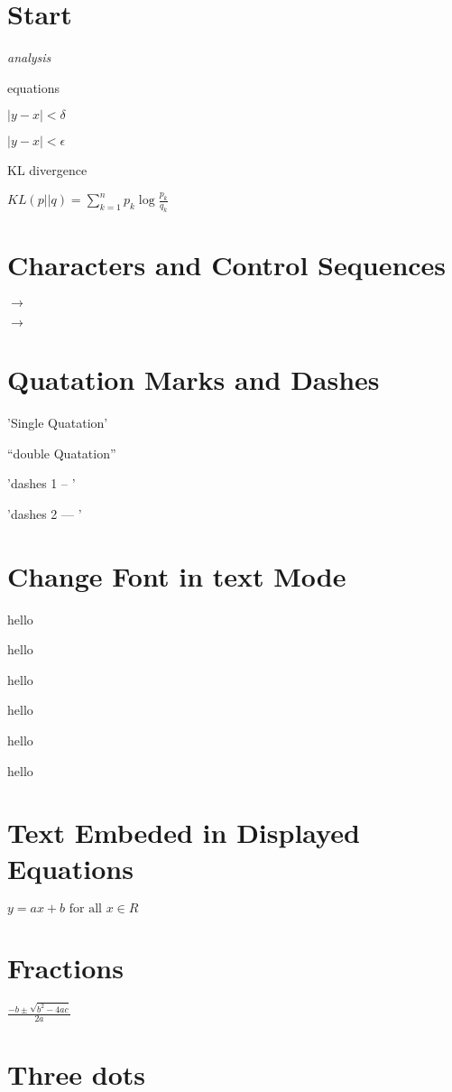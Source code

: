 \documentclass{beamer}
\begin{document}
\section{Start}

\noindent
\emph{analysis}

equations 

$|y-x| < \delta $

$|y-x| < \epsilon$

KL divergence

$KL(p||q) = \sum_{k=1}^{n} p_k \log \frac{p_k}{q_k} $


\section{Characters and Control Sequences}


$\to$

$\rightarrow$


\section{Quatation Marks and Dashes}


'Single Quatation'

``double Quatation''

'dashes 1 -- '

'dashes 2 --- '


\section{Change Font in text Mode}
\tiny hello

\small hello


\Large hello

\huge hello


\small hello

\large hello

\section{Text Embeded in Displayed Equations}


$y = ax + b \mbox{ for all } x \in R $

\section{Fractions}

$\frac{-b \pm \sqrt{b^2 - 4ac}}{2a}$

\section{Three dots}
\end{document}
